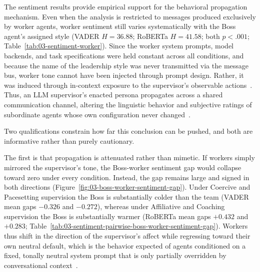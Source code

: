 The sentiment results provide empirical support for the behavioral propagation mechanism.
Even when the analysis is restricted to messages produced exclusively by worker agents, worker sentiment still varies systematically with the Boss agent's assigned style (\ac{VADER} $H = 36.88$; \ac{RoBERTa} $H = 41.58$; both $p < .001$; Table~\ref{tab:03-sentiment-worker}).
Since the worker system prompts, model backends, and task specifications were held constant across all conditions, and because the name of the leadership style was never transmitted via the message bus, worker tone cannot have been injected through prompt design.
Rather, it was induced through in-context exposure to the supervisor's observable actions~\cite{lin2025simulatingsocialinfluencedynamics, almutairi2025taifaautomatedfeedback}.
Thus, an \ac{LLM} supervisor's enacted persona propagates across a shared communication channel, altering the linguistic behavior and subjective ratings of subordinate agents whose own configuration never changed~\cite{serapiogarcia2025personalitytraitslargelanguage, jiang2024personallminvestigatingabilitylarge, duan2025powerpersonalityhumansimulation}.

Two qualifications constrain how far this conclusion can be pushed, and both are informative rather than purely cautionary.

The first is that propagation is attenuated rather than mimetic.
If workers simply mirrored the supervisor's tone, the Boss-worker sentiment gap would collapse toward zero under every condition.
Instead, the gap remains large and signed in both directions (Figure~\ref{fig:03-boss-worker-sentiment-gap}).
Under Coercive and Pacesetting supervision the Boss is substantially colder than the team (VADER mean gaps $-0.326$ and $-0.272$), whereas under Affiliative and Coaching supervision the Boss is substantially warmer (RoBERTa mean gaps $+0.432$ and $+0.283$; Table~\ref{tab:03-sentiment-pairwise-boss-worker-sentiment-gap}).
Workers thus shift in the direction of the supervisor's affect while regressing toward their own neutral default, which is the behavior expected of agents conditioned on a fixed, tonally neutral system prompt that is only partially overridden by conversational context~\cite{lacava2025openmodelsclosedminds, shanahan2023roleplaylargelanguagemodels}.

